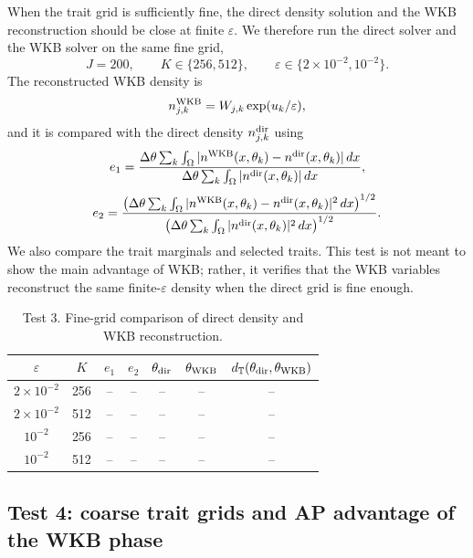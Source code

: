 \documentclass[11pt]{article}
\begin{document}
When the trait grid is sufficiently fine, the direct density solution and the WKB reconstruction should be close at finite \(\varepsilon\).  We therefore run the direct solver and the WKB solver on the same fine grid,
\[
    J=200,
    \qquad
    K\in\{256,512\},
    \qquad
    \varepsilon\in\{2\times10^{-2},10^{-2}\}.
\]
The reconstructed WKB density is
\[
    n_{j,k}^{\rm WKB}=W_{j,k}\exp(u_k/\varepsilon),
\]
and it is compared with the direct density \(n_{j,k}^{\rm dir}\) using
\begin{equation}\label{eq:n_error_fine_new}
    e_1=
    \frac{\Delta\theta\sum_k\int_\Omega |n^{\rm WKB}(x,\theta_k)-n^{\rm dir}(x,\theta_k)|\,dx}
         {\Delta\theta\sum_k\int_\Omega |n^{\rm dir}(x,\theta_k)|\,dx},
\end{equation}
\begin{equation}\label{eq:n_error_l2_fine_new}
    e_2=
    \frac{\left(\Delta\theta\sum_k\int_\Omega |n^{\rm WKB}(x,\theta_k)-n^{\rm dir}(x,\theta_k)|^2\,dx\right)^{1/2}}
         {\left(\Delta\theta\sum_k\int_\Omega |n^{\rm dir}(x,\theta_k)|^2\,dx\right)^{1/2}}.
\end{equation}
We also compare the trait marginals and selected traits.  This test is not meant to show the main advantage of WKB; rather, it verifies that the WKB variables reconstruct the same finite-\(\varepsilon\) density when the direct grid is fine enough.

\begin{table}[ht]
\centering
\caption{Test 3. Fine-grid comparison of direct density and WKB reconstruction.}
\begin{tabular}{ccccccc}
\toprule
$\varepsilon$ & $K$ & $e_1$ & $e_2$ & $\theta_{\rm dir}$ & $\theta_{\rm WKB}$ & $d_{\mathbb T}(\theta_{\rm dir},\theta_{\rm WKB})$\\
\midrule
$2\times10^{-2}$ & 256 & -- & -- & -- & -- & --\\
$2\times10^{-2}$ & 512 & -- & -- & -- & -- & --\\
$10^{-2}$ & 256 & -- & -- & -- & -- & --\\
$10^{-2}$ & 512 & -- & -- & -- & -- & --\\
\bottomrule
\end{tabular}
\end{table}

\subsection{Test 4: coarse trait grids and AP advantage of the WKB phase}\label{subsec:test_coarse_AP_new}
\end{document}

